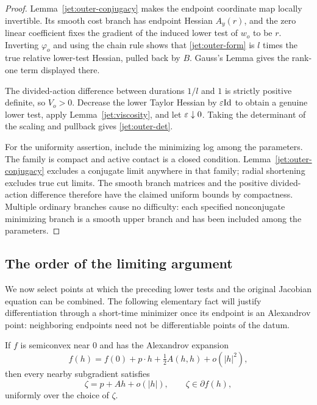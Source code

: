 \begin{proof}
Lemma~\ref{jet:outer-conjugacy} makes the endpoint coordinate map
locally invertible. Its smooth cost branch has endpoint Hessian
$A_y(r)$, and the zero linear coefficient fixes the gradient of
the induced lower test of $w_o$ to be $r$. Inverting
$\varphi_o$ and using the chain rule shows that
\eqref{jet:outer-form} is $l$ times the true relative lower-test
Hessian, pulled back by $B$. Gauss's Lemma gives the rank-one
term displayed there.

The divided-action difference between durations $1/l$ and $1$
is strictly positive definite, so $V_o>0$. Decrease the lower
Taylor Hessian by $\varepsilon\mathrm{Id}$ to obtain a genuine lower test,
apply Lemma~\ref{jet:viscosity}, and let $\varepsilon\downarrow0$.
Taking the determinant of the scaling and pullback gives
\eqref{jet:outer-det}.

For the uniformity assertion, include the minimizing log among
the parameters. The family is compact and active contact is a
closed condition. Lemma~\ref{jet:outer-conjugacy} excludes a
conjugate limit anywhere in that family; radial shortening
excludes true cut limits. The smooth branch matrices and the
positive divided-action difference therefore have the claimed
uniform bounds by compactness. Multiple ordinary branches
cause no difficulty: each specified nonconjugate minimizing
branch is a smooth upper branch and has been included among
the parameters.
\end{proof}

\subsection{The order of the limiting argument}

We now select points at which the preceding lower tests and the original
Jacobian equation can be combined. The following elementary fact will
justify differentiation through a short-time minimizer once its endpoint
is an Alexandrov point: neighboring endpoints need not be differentiable
points of the datum.

\begin{lemma}\label{jet:subgradient-differential}
If $f$ is semiconvex near $0$ and has the Alexandrov expansion
\[
 f(h)=f(0)+p\cdot h+\tfrac12 A(h,h)+o(|h|^2),
\]
then every nearby subgradient satisfies
\[
 \zeta=p+Ah+o(|h|),\qquad \zeta\in\partial f(h),
\]
uniformly over the choice of $\zeta$.
\end{lemma}


